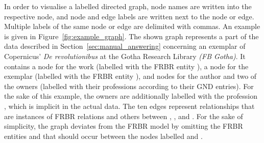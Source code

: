In order to visualise a labelled directed graph,
node names are written into the respective node,
and node and edge labels are written next to the node or edge.
Multiple labels of the same node or edge are delimited with commas.
An example is given in Figure~\ref{fig:example_graph}.
The shown graph represents a part of the data described in Section~\ref{sec:manual_answering}
concerning an exemplar of Copernicus' \emph{\foreignlanguage{latin}{De revolutionibus}} at the
\foreignlanguage{ngerman}{Gotha} Research Library \emph{(\foreignlanguage{ngerman}{FB Gotha})}.
It contains a node for the work (labelled with the \gls{FRBR} entity ),
a node for the exemplar (labelled with the \gls{FRBR} entity ),
and nodes for the author and two of the owners (labelled with their professions according to their \gls{GND} entries).
For the sake of this example, the owners are additionally labelled with the profession
, which is implicit in the actual data.
The ten edges represent relationships that are instances
of \gls{FRBR} relations and others between , , and .
For the sake of simplicity, the graph deviates from the \gls{FRBR} model \autocite{FRBR1998}
by omitting the \gls{FRBR} entities  and 
that should occur between the nodes labelled  and .

